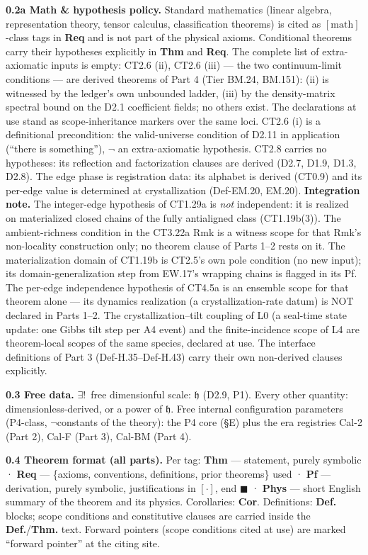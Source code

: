 \textbf{0.2a Math \& hypothesis policy.} Standard mathematics (linear algebra, representation theory, tensor calculus, classification theorems) is cited as $[\text{math}]$-class tags in \textbf{Req} and is not part of the physical axioms. Conditional theorems carry their hypotheses explicitly in \textbf{Thm} and \textbf{Req}. The complete list of extra-axiomatic inputs is empty: CT2.6 (ii), CT2.6 (iii) — the two continuum-limit conditions — are derived theorems of Part 4 (Tier BM.24, BM.151): (ii) is witnessed by the ledger's own unbounded ladder, (iii) by the density-matrix spectral bound on the D2.1 coefficient fields; no others exist. The declarations at use stand as scope-inheritance markers over the same loci. CT2.6 (i) is a definitional precondition: the valid-universe condition of D2.11 in application (“there is something”), $\neg$ an extra-axiomatic hypothesis. CT2.8 carries no hypotheses: its reflection and factorization clauses are derived (D2.7, D1.9, D1.3, D2.8). The edge phase is registration data: its alphabet is derived (CT0.9) and its per-edge value is determined at crystallization (Def-EM.20, EM.20). \textbf{Integration note.} The integer-edge hypothesis of CT1.29a is \textit{not} independent: it is realized on materialized closed chains of the fully antialigned class (CT1.19b(3)). The ambient-richness condition in the CT3.22a Rmk is a witness scope for that Rmk's non-locality construction only; no theorem clause of Parts 1–2 rests on it. The materialization domain of CT1.19b is CT2.5’s own pole condition (no new input); its domain-generalization step from EW.17’s wrapping chains is flagged in its Pf. The per-edge independence hypothesis of CT4.5a is an ensemble scope for that theorem alone — its dynamics realization (a crystallization-rate datum) is NOT declared in Parts 1–2. The crystallization–tilt coupling of L0 (a seal-time state update: one Gibbs tilt step per A4 event) and the finite-incidence scope of L4 are theorem-local scopes of the same species, declared at use. The interface definitions of Part 3 (Def-H.35–Def-H.43) carry their own non-derived clauses explicitly.

\textbf{0.3 Free data.} $\exists!\,$ free dimensionful scale: $\mathfrak h$ (D2.9, P1). Every other quantity: dimensionless-derived, or a power of $\mathfrak h$. Free internal configuration parameters (P4-class, $\neg$constants of the theory): the P4 core (§E) plus the era registries Cal-2 (Part 2), Cal-F (Part 3), Cal-BM (Part 4).

\textbf{0.4 Theorem format (all parts).} Per tag: \textbf{Thm} — statement, purely symbolic · \textbf{Req} — \{axioms, conventions, definitions, prior theorems\} used · \textbf{Pf} — derivation, purely symbolic, justifications in $[\cdot]$, end $\blacksquare$ · \textbf{Phys} — short English summary of the theorem and its physics. Corollaries: \textbf{Cor}. Definitions: \textbf{Def.} blocks; scope conditions and constitutive clauses are carried inside the \textbf{Def.}/\textbf{Thm.} text. Forward pointers (scope conditions cited at use) are marked “forward pointer” at the citing site.


